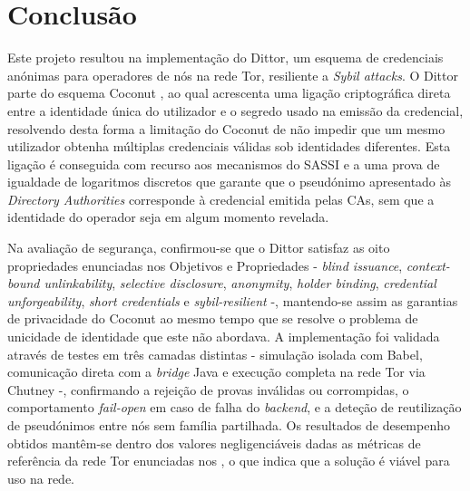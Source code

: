 

\chapter{Conclusão}
\label{conclusao}

Este projeto resultou na implementação do Dittor, um esquema de credenciais anónimas para operadores de nós na rede Tor, resiliente a \textit{Sybil attacks}. O Dittor parte do esquema Coconut \cite{sonnino2018coconut}, ao qual acrescenta uma ligação criptográfica direta entre a identidade única do utilizador e o segredo usado na emissão da credencial, resolvendo desta forma a limitação do Coconut de não impedir que um mesmo utilizador obtenha múltiplas credenciais válidas sob identidades diferentes. Esta ligação é conseguida com recurso aos mecanismos do SASSI \cite{crites2025syra} e a uma prova de igualdade de logaritmos discretos que garante que o pseudónimo apresentado às \textit{Directory Authorities} corresponde à credencial emitida pelas CAs, sem que a identidade do operador seja em algum momento revelada.

Na avaliação de segurança, confirmou-se que o Dittor satisfaz as oito propriedades enunciadas nos Objetivos e Propriedades - \textit{blind issuance}, \textit{context-bound unlinkability}, \textit{selective disclosure}, \textit{anonymity}, \textit{holder binding}, \textit{credential unforgeability}, \textit{short credentials} e \textit{sybil-resilient} -, mantendo-se assim as garantias de privacidade do Coconut ao mesmo tempo que se resolve o problema de unicidade de identidade que este não abordava. A implementação foi validada através de testes em três camadas distintas - simulação isolada com Babel, comunicação direta com a \textit{bridge} Java e execução completa na rede Tor via Chutney -, confirmando a rejeição de provas inválidas ou corrompidas, o comportamento \textit{fail-open} em caso de falha do \textit{backend}, e a deteção de reutilização de pseudónimos entre nós sem família partilhada. Os resultados de desempenho obtidos mantêm-se dentro dos valores negligenciáveis dadas as métricas de referência da rede Tor enunciadas nos , o que indica que a solução é viável para uso na rede.

